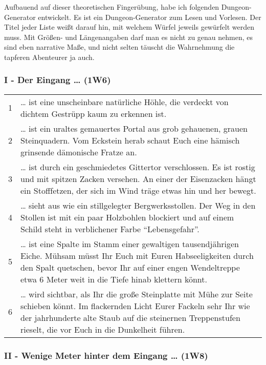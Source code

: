 Aufbauend auf dieser theoretischen Fingerübung, habe ich folgenden
Dungeon-Generator entwickelt. Es ist ein Dungeon-Generator zum
Lesen und Vorlesen. Der Titel jeder Liste weißt darauf hin, mit
welchem Würfel jeweils gewürfelt werden muss. Mit Größen- und
Längenangaben darf man es nicht zu genau nehmen, es sind eben
narrative Maße, und nicht selten täuscht die Wahrnehmung die
tapferen Abenteurer ja auch.

\subsubsection{I - Der Eingang \ldots{} (1W6)}

\begin{tabularx}{\columnwidth}{cZ}
1 &  \ldots{} ist eine unscheinbare natürliche Höhle, die verdeckt von
  dichtem Gestrüpp kaum zu erkennen ist.\\
2 & \ldots{} ist ein uraltes gemauertes Portal aus grob gehauenen, grauen
  Steinquadern. Vom Eckstein herab schaut Euch eine hämisch grinsende
  dämonische Fratze an.\\
3 &  \ldots{} ist durch ein geschmiedetes Gittertor verschlossen. Es ist
  rostig und mit spitzen Zacken versehen. An einer der Eisenzacken hängt
  ein Stofffetzen, der sich im Wind träge etwas hin und her
  bewegt.\\
4 &  \ldots{} sieht aus wie ein stillgelegter Bergwerksstollen. Der Weg in
  den Stollen ist mit ein paar Holzbohlen blockiert und auf einem Schild
  steht in verblichener Farbe ``Lebensgefahr''.\\
5 &  \ldots{} ist eine Spalte im Stamm einer gewaltigen tausendjährigen
  Eiche. Mühsam müsst Ihr Euch mit Euren Habseeligkeiten durch den Spalt
  quetschen, bevor Ihr auf einer engen Wendeltreppe etwa 6 Meter weit in
  die Tiefe hinab klettern könnt.\\
6 &  \ldots{} wird sichtbar, als Ihr die große Steinplatte mit Mühe zur
  Seite schieben könnt. Im flackernden Licht Eurer Fackeln sehr Ihr wie
  der jahrhunderte alte Staub auf die steinernen Treppenstufen rieselt,
  die vor Euch in die Dunkelheit führen.\\
\end{tabularx}

\subsubsection{II - Wenige Meter hinter dem Eingang \ldots{} (1W8)}

